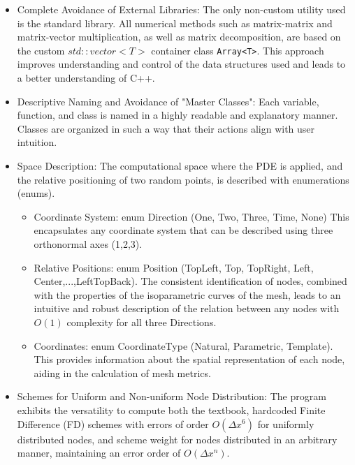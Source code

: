 \documentclass{article}
\begin{document}
	
	\begin{itemize}
		
		\item Complete Avoidance of External Libraries: The only non-custom utility used is the standard library. All numerical methods such as matrix-matrix and matrix-vector multiplication, as well as matrix decomposition, are based on the custom $std::vector<T>$ container class \texttt{Array<T>}. This approach improves understanding and control of the data structures used and leads to a better understanding of C++.
		
		\item Descriptive Naming and Avoidance of "Master Classes": Each variable, function, and class is named in a highly readable and explanatory manner. Classes are organized in such a way that their actions align with user intuition.
		
		
		\item Space Description: The computational space where the PDE is applied, and the relative positioning of two random points, is described with enumerations (enums).
		
		\begin{itemize}
			\item Coordinate System: enum Direction (One, Two, Three, Time, None) \newline
			This encapsulates any coordinate system that can be described using three orthonormal axes (1,2,3).
			
			\item Relative Positions: enum Position (TopLeft, Top, TopRight, Left, Center,...,LeftTopBack). \newline
			The consistent identification of nodes, combined with the properties of the isoparametric curves of the mesh, leads to an intuitive and robust description of the relation between any nodes with $O(1)$ complexity for all three Directions.
			
			\item Coordinates: enum CoordinateType (Natural, Parametric, Template). \newline
			This provides information about the spatial representation of each node, aiding in the calculation of mesh metrics.
		\end{itemize}
		
		\item Schemes for Uniform and Non-uniform Node Distribution: The program exhibits the versatility to compute both the textbook, hardcoded Finite Difference (FD) schemes with errors of order $O(\Delta x^6)$ for uniformly distributed nodes, and scheme weight for nodes distributed in an arbitrary manner, maintaining an error order of $O(\Delta x^n)$.
		

\end{itemize}
\end{document}

